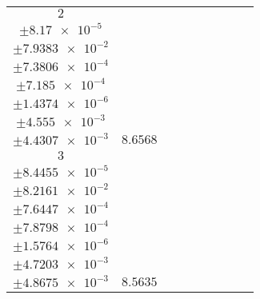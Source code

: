 \documentclass[8pt]{article}
\begin{document}
\begin{longtable}[l]{c c c c c c c c c}
$\num{2}$ & \begin{tabular}[c]{@{}c@{}}$\num{5.9925e-2}$ \\ $\pm\num{8.17e-5}$\end{tabular} & \begin{tabular}[c]{@{}c@{}}$\num{8.6255e-2}$ \\ $\pm\num{7.9383e-2}$\end{tabular} & \begin{tabular}[c]{@{}c@{}}$\num{-4.4437}$ \\ $\pm\num{7.3806e-4}$\end{tabular} & \begin{tabular}[c]{@{}c@{}}$\num{1.3298e+3}$ \\ $\pm\num{7.185e-4}$\end{tabular} & \begin{tabular}[c]{@{}c@{}}$\num{2.6603}$ \\ $\pm\num{1.4374e-6}$\end{tabular} & \begin{tabular}[c]{@{}c@{}}$\num{2.8466}$ \\ $\pm\num{4.555e-3}$\end{tabular} & \begin{tabular}[c]{@{}c@{}}$\num{2.7542}$ \\ $\pm\num{4.4307e-3}$\end{tabular} & $\num{8.6568}$\\
$\num{3}$ & \begin{tabular}[c]{@{}c@{}}$\num{5.9958e-2}$ \\ $\pm\num{8.4455e-5}$\end{tabular} & \begin{tabular}[c]{@{}c@{}}$\num{0.63833}$ \\ $\pm\num{8.2161e-2}$\end{tabular} & \begin{tabular}[c]{@{}c@{}}$\num{4.4375}$ \\ $\pm\num{7.6447e-4}$\end{tabular} & \begin{tabular}[c]{@{}c@{}}$\num{1.3386e+3}$ \\ $\pm\num{7.8798e-4}$\end{tabular} & \begin{tabular}[c]{@{}c@{}}$\num{2.678}$ \\ $\pm\num{1.5764e-6}$\end{tabular} & \begin{tabular}[c]{@{}c@{}}$\num{2.8483}$ \\ $\pm\num{4.7203e-3}$\end{tabular} & \begin{tabular}[c]{@{}c@{}}$\num{2.9358}$ \\ $\pm\num{4.8675e-3}$\end{tabular} & $\num{8.5635}$\\

\end{longtable}
\end{document}
